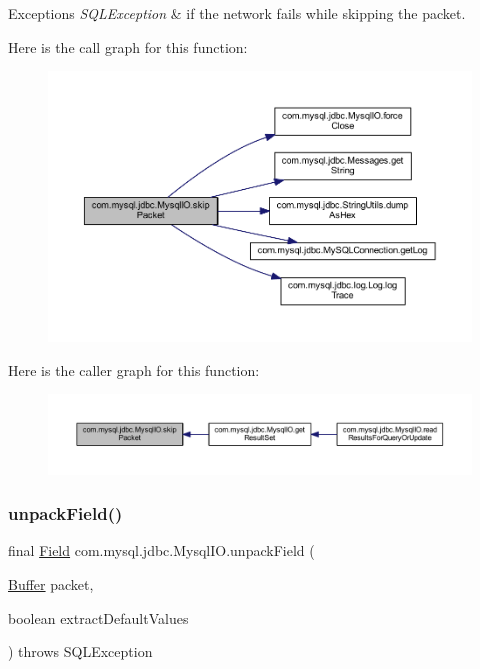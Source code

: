 \begin{DoxyExceptions}{Exceptions}
{\em S\+Q\+L\+Exception} & if the network fails while skipping the packet. \\
\hline
\end{DoxyExceptions}
Here is the call graph for this function\+:
\nopagebreak
\begin{figure}[H]
\begin{center}
\leavevmode
\includegraphics[width=350pt]{classcom_1_1mysql_1_1jdbc_1_1_mysql_i_o_a9b5ceba1f2420b68450dd1f8ae9ad53a_cgraph}
\end{center}
\end{figure}
Here is the caller graph for this function\+:
\nopagebreak
\begin{figure}[H]
\begin{center}
\leavevmode
\includegraphics[width=350pt]{classcom_1_1mysql_1_1jdbc_1_1_mysql_i_o_a9b5ceba1f2420b68450dd1f8ae9ad53a_icgraph}
\end{center}
\end{figure}
\mbox{\label{classcom_1_1mysql_1_1jdbc_1_1_mysql_i_o_a2da4fe16e54a2d70893f1b5da3bdb1af}} 
\subsubsection{\texorpdfstring{unpack\+Field()}{unpackField()}}
{\footnotesize\ttfamily final \mbox{\hyperlink{classcom_1_1mysql_1_1jdbc_1_1_field}{Field}} com.\+mysql.\+jdbc.\+Mysql\+I\+O.\+unpack\+Field (\begin{DoxyParamCaption}\item[{\mbox{\hyperlink{classcom_1_1mysql_1_1jdbc_1_1_buffer}{Buffer}}}]{packet,  }\item[{boolean}]{extract\+Default\+Values }\end{DoxyParamCaption}) throws S\+Q\+L\+Exception\hspace{0.3cm}{\ttfamily [protected]}}

